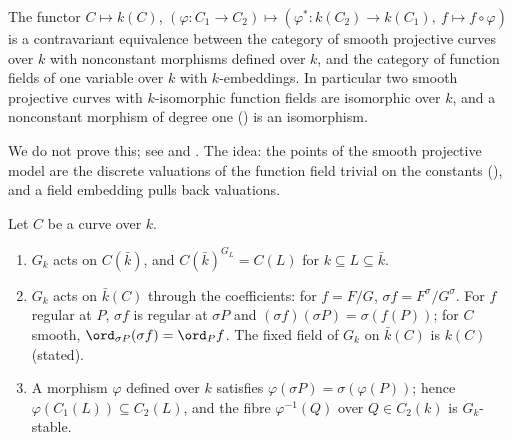 \begin{theorem}\label{thm:curves:equivalence}
The functor $C\mapsto k(C)$, $(\varphi\colon C_1\to C_2)\mapsto(\varphi^*\colon k(C_2)\to k(C_1),\ f\mapsto f\circ\varphi)$ is a contravariant equivalence between the
category of smooth projective curves over $k$ with nonconstant morphisms defined over $k$, and the category of function fields of one variable over $k$
with $k$-embeddings. In particular two smooth projective curves with $k$-isomorphic function fields are isomorphic over $k$, and a nonconstant
morphism of degree one () is an isomorphism.
\end{theorem}

We do not prove this; see \cite[Chapter II, Theorem 2.4]{SilvermanAEC} and \cite[Chapter I, Corollary 6.12]{Hartshorne}. The idea: the points of
the smooth projective model are the discrete valuations of the function field trivial on the constants (), and a field
embedding pulls back valuations.

\begin{proposition}\label{prop:curves:galois-action}
Let $C$ be a curve over $k$.
\begin{enumerate}[label=(\roman*)]
\item $G_k$ acts on $C(\bar k)$, and $C(\bar k)^{G_L}=C(L)$ for $k\subseteq L\subseteq\bar k$.
\item $G_k$ acts on $\bar k(C)$ through the coefficients: for $f=F/G$, $\sigma f=F^\sigma/G^\sigma$. For $f$ regular at $P$, $\sigma f$ is regular at $\sigma P$ and
$(\sigma f)(\sigma P)=\sigma(f(P))$; for $C$ smooth, $\ord_{\sigma P}(\sigma f)=\ord_Pf$. The fixed field of $G_k$ on $\bar k(C)$ is $k(C)$ (stated).
\item A morphism $\varphi$ defined over $k$ satisfies $\varphi(\sigma P)=\sigma(\varphi(P))$; hence $\varphi(C_1(L))\subseteq C_2(L)$, and the fibre $\varphi^{-1}(Q)$ over $Q\in C_2(k)$ is
$G_k$-stable.
\end{enumerate}
\end{proposition}


